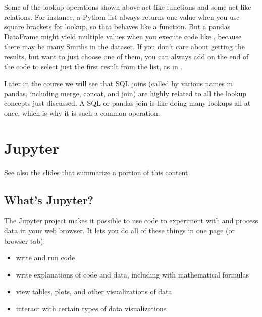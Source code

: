 \documentclass[letterpaper,10pt,english]{jupyterBook}
\begin{document}
\sphinxAtStartPar
Some of the lookup operations shown above act like functions and some act like relations.  For instance, a Python list always returns one value when you use square brackets for lookup, so that behaves like a function.  But a pandas DataFrame might yield multiple values when you execute code like , because there may be many Smiths in the dataset.  If you don’t care about getting  the results, but want to just choose one of them, you can always add  on the end of the code to select just the first result from the list, as in .

\sphinxAtStartPar
Later in the course we will see that SQL joins (called by various names in pandas, including merge, concat, and join) are highly related to all the lookup concepts just discussed.  A SQL or pandas join is like doing many lookups all at once, which is why it is such a common operation.


\chapter{Jupyter}
\label{\detokenize{chapter-3-jupyter:jupyter}}\label{\detokenize{chapter-3-jupyter::doc}}
\sphinxAtStartPar
See also the slides that summarize a portion of this content.


\section{What’s Jupyter?}
\label{\detokenize{chapter-3-jupyter:what-s-jupyter}}
\sphinxAtStartPar
The Jupyter project makes it possible to use code to experiment with and process data in your web browser.  It lets you do all of these things in one page (or browser tab):
\begin{itemize}
\item {} 
\sphinxAtStartPar
write and run code

\item {} 
\sphinxAtStartPar
write explanations of code and data, including with mathematical formulas

\item {} 
\sphinxAtStartPar
view tables, plots, and other visualizations of data

\item {} 
\sphinxAtStartPar
interact with certain types of data visualizations

\end{itemize}
\end{document}
